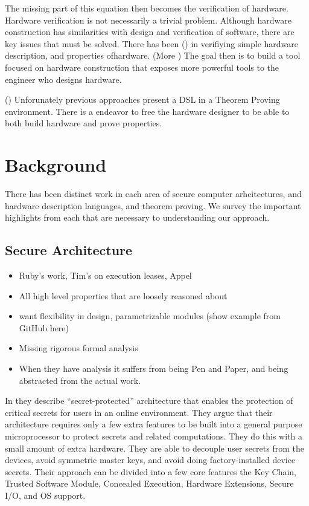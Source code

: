 \documentclass[12pt, titlepage]{article}
\begin{document}
The missing part of this equation then becomes the verification of hardware. Hardware verification is not necessarily a trivial
problem. Although hardware construction has similarities with design and verification of software, there are 
key issues that must be solved. There has been () in verifiying simple hardware description, and properties ofhardware. (More ) The goal then is to build a tool focused on hardware construction that exposes
more powerful tools to the engineer who designs hardware. 

()
Unforunately previous approaches present a DSL in a 
Theorem Proving environment. There is a endeavor to free the hardware designer to be able to both build
hardware and prove properties.

\section{Background}
There has been distinct work in each area of secure computer arhcitectures, and 
hardware description languages, and theorem proving. We survey the important highlights from each
that are necessary to understanding our approach.

\subsection{Secure Architecture}
\begin{itemize}
    \item Ruby's work, Tim's on execution leases, Appel
    \item All high level properties that are loosely reasoned about
    \item want flexibility in design, parametrizable modules (show example from GitHub here)
    \item Missing rigorous formal analysis
    \item When they have analysis it suffers from being Pen and Paper, and being abstracted from the actual work.
\end{itemize}

In \cite{lee05} they describe “secret-protected” architecture that enables the protection of critical secrets for users in an online environment. They argue that their architecture requires only a few extra features to be built into a general purpose microprocessor to protect secrets and related computations. They do this with a small amount of extra hardware. They are able to decouple user secrets from the devices, avoid symmetric master keys, and avoid doing factory-installed device secrets. Their approach can be divided into a few core features the Key Chain, Trusted Software Module, Concealed Execution, Hardware Extensions, Secure I/O, and OS support. 
\end{document}
